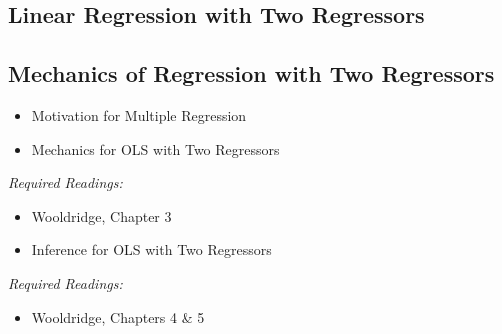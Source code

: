 \documentclass[PS]{syllabus}
\begin{document}
\begin{syllabus}


\section{Linear Regression with Two Regressors}
\subsection{Mechanics of Regression with Two Regressors}
\begin{itemize}
\item Motivation for Multiple Regression
\item Mechanics for OLS with Two Regressors
\end{itemize}
\textit{Required Readings:} \begin{itemize}
  \item Wooldridge, Chapter 3
\end{itemize}
\begin{itemize}
\item Inference for OLS with Two Regressors
\end{itemize}
\textit{Required Readings:} \begin{itemize}
  \item Wooldridge, Chapters 4 \& 5
\end{itemize}


\end{syllabus}
\end{document}
